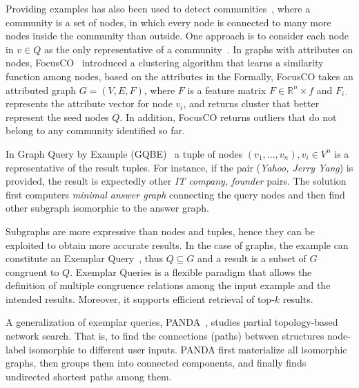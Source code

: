 Providing examples has also been used to detect communities~\citep{staudt2014detecting,perozzi2014focused}, where a community is a set of nodes, in which every node is connected to many more nodes inside the community than outside. 
One approach is to consider each node in $v \in Q$ as the only representative of a community~\citep{staudt2014detecting}. 
In graphs with attributes on nodes, FocusCO~\citep{perozzi2014focused} introduced a clustering algorithm that learns a similarity function among nodes, based on the attributes in the 
Formally, FocusCO takes an attributed graph $G = (V,E,F)$, where $F$ is a feature matrix $F \in \mathbb{R}^n\times f$ and $F_{i\cdot}$ represents the attribute vector for node $v_i$, and returns cluster that better represent the seed nodes $Q$.
In addition, FocusCO returns outliers that do not belong to any community identified so far.  



In Graph Query by Example (GQBE)~\citep{jayaram2015querying} a tuple of nodes $(v_1, ..., v_n), v_i \in V^n$ is a representative of the result tuples. 
For instance, if the pair (\emph{Yahoo, Jerry Yang}) is provided, the result is expectedly other \emph{IT company, founder} pairs. 
The solution first computers \emph{minimal answer graph} connecting the query nodes and then find other subgraph isomorphic to the answer graph. 

Subgraphs are more expressive than nodes and tuples, hence they can be exploited to obtain more accurate results. 
In the case of graphs, the example can constitute an Exemplar Query~\citep{mottin2016exemplar}, thus $Q\subseteq G$ and a result is a subset of $G$ congruent to $Q$.
Exemplar Queries is a flexible paradigm that allows the definition of multiple congruence relations among the input example and the intended results. 
Moreover, it supports efficient retrieval of top-$k$ results. 

A generalization of exemplar queries, PANDA~\citep{xie2017panda}, studies partial topology-based network search. 
That is, to find the connections (paths) between structures node-label isomorphic to different user inputs. 
PANDA first materialize all isomorphic graphs, then groups them into connected components, and finally finds undirected shortest paths among them. 

